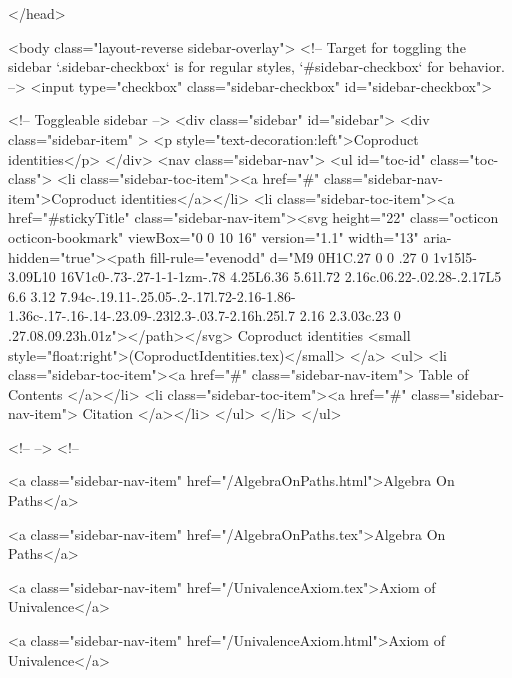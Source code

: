 </head>


  <body class="layout-reverse sidebar-overlay">
    <!-- Target for toggling the sidebar `.sidebar-checkbox` is for regular
     styles, `#sidebar-checkbox` for behavior. -->
<input type="checkbox" class="sidebar-checkbox" id="sidebar-checkbox">

<!-- Toggleable sidebar -->
<div class="sidebar" id="sidebar">
  <div class="sidebar-item" >
    <p style="text-decoration:left">Coproduct identities</p>
  </div>
  <nav class="sidebar-nav">
    <ul id="toc-id" class="toc-class">
  <li class="sidebar-toc-item"><a href="#" class="sidebar-nav-item">Coproduct identities</a></li>
  <li class="sidebar-toc-item"><a href="#stickyTitle" class="sidebar-nav-item"><svg height="22" class="octicon octicon-bookmark" viewBox="0 0 10 16" version="1.1" width="13" aria-hidden="true"><path fill-rule="evenodd" d="M9 0H1C.27 0 0 .27 0 1v15l5-3.09L10 16V1c0-.73-.27-1-1-1zm-.78 4.25L6.36 5.61l.72 2.16c.06.22-.02.28-.2.17L5 6.6 3.12 7.94c-.19.11-.25.05-.2-.17l.72-2.16-1.86-1.36c-.17-.16-.14-.23.09-.23l2.3-.03.7-2.16h.25l.7 2.16 2.3.03c.23 0 .27.08.09.23h.01z"></path></svg> Coproduct identities <small style="float:right">(CoproductIdentities.tex)</small>
</a>
    <ul>
      <li class="sidebar-toc-item"><a href="#" class="sidebar-nav-item"> Table of Contents </a></li>
      <li class="sidebar-toc-item"><a href="#" class="sidebar-nav-item"> Citation </a></li>
    </ul>
  </li>
</ul>


    <!--  -->
    <!-- 
      
    
      
    
      
    
      
        
      
    
      
        
          <a class="sidebar-nav-item" href="/AlgebraOnPaths.html">Algebra On Paths</a>
        
      
    
      
        
          <a class="sidebar-nav-item" href="/AlgebraOnPaths.tex">Algebra On Paths</a>
        
      
    
      
        
          <a class="sidebar-nav-item" href="/UnivalenceAxiom.tex">Axiom of Univalence</a>
        
      
    
      
        
          <a class="sidebar-nav-item" href="/UnivalenceAxiom.html">Axiom of Univalence</a>
        

